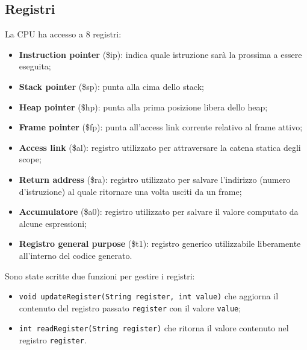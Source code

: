 \documentclass[../report.tex]{subfiles}
\begin{document}
\subsection{Registri}
La CPU ha accesso a 8 registri:
\begin{itemize}
    \item \textbf{Instruction pointer} (\$ip): indica quale istruzione sar\`a la prossima a essere eseguita;
    \item \textbf{Stack pointer} (\$sp): punta alla cima dello stack;
    \item \textbf{Heap pointer} (\$hp): punta alla prima posizione libera dello heap;
    \item \textbf{Frame pointer} (\$fp): punta all'access link corrente relativo al frame attivo;
    \item \textbf{Access link} (\$al): registro utilizzato per attraversare la catena statica degli scope;
    \item \textbf{Return address} (\$ra): registro utilizzato per salvare l'indirizzo (numero d'istruzione) al quale ritornare una volta usciti da un frame;
    \item \textbf{Accumulatore} (\$a0): registro utilizzato per salvare il valore computato da alcune espressioni;
    \item \textbf{Registro general purpose} (\$t1): registro generico utilizzabile liberamente all'interno del codice generato.
\end{itemize}
Sono state scritte due funzioni per gestire i registri:
\begin{itemize}
    \item \verb|void updateRegister(String register, int value)| che aggiorna il contenuto del registro passato \verb|register| con il valore \verb|value|;
    \item \verb|int readRegister(String register)| che ritorna il valore contenuto nel registro \verb|register|.
\end{itemize}
\end{document}
